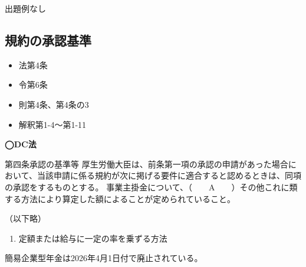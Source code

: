 出題例なし

\newpage

\subsection{規約の承認基準}


\begin{InyouJobunbox}
  \begin{itemize}
    \item 法第4条
    \item 令第6条
    \item 則第4条、第4条の3
    \item 解釈第1-4〜第1-11
  \end{itemize}
\end{InyouJobunbox}

\begin{fillblank}[数理人試験 2021 問題1 設問5（改題）]
    \noindent \textbf{◯DC法}
  \begin{lawstructure}
    \begin{lawarticle}{第四条}{承認の基準等}
      厚生労働大臣は、前条第一項の承認の申請があった場合において、当該申請に係る規約が次に掲げる要件に適合すると認めるときは、同項の承認をするものとする。
      事業主掛金について、（　　A　　）その他これに類する方法により算定した額によることが定められていること。

      （以下略）
    \end{lawarticle}
  \end{lawstructure}
\end{fillblank}

\begin{answerbox}
  \begin{enumerate}[A:]
    \item 定額または給与に一定の率を乗ずる方法
  \end{enumerate}
\end{answerbox}

\begin{explanationbox}
  簡易企業型年金は2026年4月1日付で廃止されている。
\end{explanationbox}



